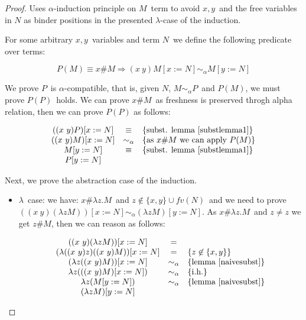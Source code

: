 \documentclass[preprint,10pt]{sigplanconf}
\newcommand{\alp}{\ensuremath{\alpha}}
\newcommand{\lam}{\ensuremath{\lambda}}
\newcommand{\alpsym}{\ensuremath{\sim_\alpha}}
\begin{document}
\begin{proof} 
Uses \alp-induction principle on $M$\ term to avoid $x,y$\ and the free variables in $N$ as binder positions in the presented \lam-case of the induction.

For some arbitrary $x,y$\ variables and term $N$\ we define the following predicate over terms:

\[ P(M) \equiv x \# M \Rightarrow  (x\ y) M [x:=N] \alpsym  M [y := N] \]

We prove $P$\ is \alp-compatible, that is, given $N$, $M \alpsym P$\ and $P(M)$, we must prove $P(P)$\ holds. We can prove $x \# M$\ as freshness is preserved throgh alpha relation, then we can prove $P(P)$ as follows:

\[
\begin{array}{ccl}
         (( x\ y) P) [ x := N ] &\equiv& \{\text{subst. lemma~\ref{substlemma1}} \}\\
         ((x\ y) M) [ x :=  N ] &\alpsym& \{ \text{as } x \# M\ \text{we can apply}\ P(M) \}\\
         M [ y := N ] &\equiv& \{\text{subst. lemma~\ref{substlemma1}}\} \\ 
         P [ y := N ]
\end{array}
\]

Next, we prove the abstraction case of the induction.

  \begin{itemize}
  \item \lam\ case: we have: $x \# \lam z. M$\ and $z \not\in \{x,y\} \cup fv(N)$\ and we need to prove $((x\ y) (\lam z M )) [x := N] \alpsym (\lam z M) [ y := N]$. As $x \# \lam z. M$\ and $z \not= z$ we get $z \# M$, then we can reason as follows:


    \[ \begin{array}{ccl}
      ((x\ y) (\lam z M)) [x := N] &=& \\
      (\lam ((x\ y) z) ((x\ y) M)) [x := N] &=& \{ z \not\in \{x,y\}  \}\\
      (\lam z ((x\ y) M)) [x := N] &\alpsym& \{ \text{lemma~\ref{naivesubst}} \} \\
      \lam z (((x\ y) M) [x := N])  &\alpsym& \{\text{i.h.}\}\\
      \lam z (M [y := N])  &\alpsym& \{ \text{lemma~\ref{naivesubst}} \} \\
      (\lam z M)  [y := N]
    \end{array} \]
    
  \end{itemize}
\end{proof}
\end{document}
